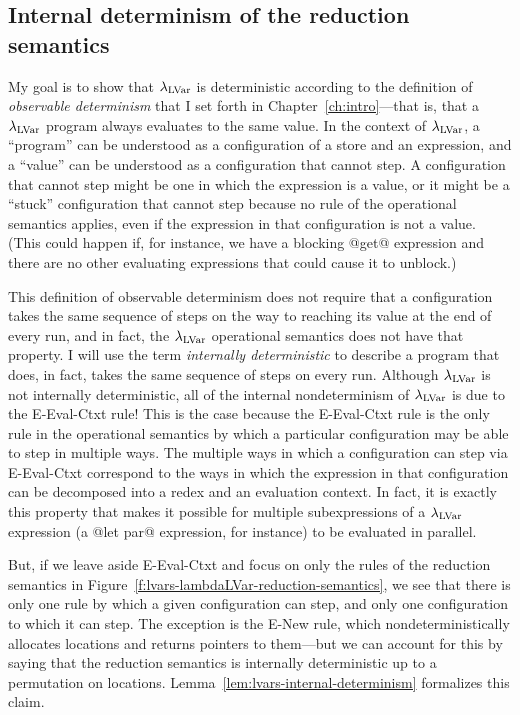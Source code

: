 \subsection{Internal determinism of the reduction semantics}

My goal is to show that $\lambda_{\textrm{LVar}}$ is deterministic according to
the definition of \emph{observable determinism} that I set forth in
Chapter~\ref{ch:intro}---that is, that a $\lambda_{\textrm{LVar}}$ program always
evaluates to the same value.  In the context of $\lambda_{\textrm{LVar}}$, a
``program'' can be understood as a configuration of a store and an
expression, and a ``value'' can be understood as a configuration that
cannot step.  A configuration that cannot step might be one in which
the expression is a value, or it might be a ``stuck'' configuration
that cannot step because no rule of the operational semantics applies,
even if the expression in that configuration is not a value.  (This
could happen if, for instance, we have a blocking @get@ expression and
there are no other evaluating expressions that could cause it to
unblock.)

This definition of observable determinism does not require that a
configuration takes the same sequence of steps on the way to reaching
its value at the end of every run, and in fact, the $\lambda_{\textrm{LVar}}$
operational semantics does not have that property.  I will use the
term \emph{internally deterministic} to describe a program that does,
in fact, takes the same sequence of steps on every run.   Although $\lambda_{\textrm{LVar}}$ is not internally
deterministic, all of the internal nondeterminism of $\lambda_{\textrm{LVar}}$ is
due to the {\sc E-Eval-Ctxt} rule!  This is the case because the {\sc
  E-Eval-Ctxt} rule is the only rule in the operational semantics by
which a particular configuration may be able to step in multiple ways.
The multiple ways in which a configuration can step via {\sc
  E-Eval-Ctxt} correspond to the ways in which the expression in that
configuration can be decomposed into a redex and an evaluation
context.  In fact, it is exactly this property that makes it possible
for multiple subexpressions of a $\lambda_{\textrm{LVar}}$ expression (a @let par@
expression, for instance) to be evaluated in parallel.

But, if we leave aside {\sc E-Eval-Ctxt} and focus on only the rules
of the reduction semantics in
Figure~\ref{f:lvars-lambdaLVar-reduction-semantics}, we see that there
is only one rule by which a given configuration can step, and only one
configuration to which it can step.  The exception is the {\sc E-New}
rule, which nondeterministically allocates locations and returns
pointers to them---but we can account for this by saying that the
reduction semantics is internally deterministic up to a permutation on
locations.  Lemma~\ref{lem:lvars-internal-determinism} formalizes this
claim.


